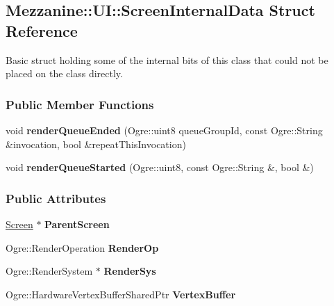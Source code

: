 \hypertarget{structMezzanine_1_1UI_1_1ScreenInternalData}{
\subsection{Mezzanine::UI::ScreenInternalData Struct Reference}
\label{structMezzanine_1_1UI_1_1ScreenInternalData}
}


Basic struct holding some of the internal bits of this class that could not be placed on the class directly.  


\subsubsection*{Public Member Functions}
\begin{DoxyCompactItemize}
\item 
\hypertarget{structMezzanine_1_1UI_1_1ScreenInternalData_a80ad5df4ba126e729748399f4bfc1aae}{
void {\bfseries renderQueueEnded} (Ogre::uint8 queueGroupId, const Ogre::String \&invocation, bool \&repeatThisInvocation)}
\label{structMezzanine_1_1UI_1_1ScreenInternalData_a80ad5df4ba126e729748399f4bfc1aae}

\item 
\hypertarget{structMezzanine_1_1UI_1_1ScreenInternalData_a2c4518c9d4adf293fce906c33f6c57f2}{
void {\bfseries renderQueueStarted} (Ogre::uint8, const Ogre::String \&, bool \&)}
\label{structMezzanine_1_1UI_1_1ScreenInternalData_a2c4518c9d4adf293fce906c33f6c57f2}

\end{DoxyCompactItemize}
\subsubsection*{Public Attributes}
\begin{DoxyCompactItemize}
\item 
\hypertarget{structMezzanine_1_1UI_1_1ScreenInternalData_a53939cdb2ea746b28f20d9b6c0e4ad5c}{
\hyperlink{classMezzanine_1_1UI_1_1Screen}{Screen} $\ast$ {\bfseries ParentScreen}}
\label{structMezzanine_1_1UI_1_1ScreenInternalData_a53939cdb2ea746b28f20d9b6c0e4ad5c}

\item 
\hypertarget{structMezzanine_1_1UI_1_1ScreenInternalData_a636b1b02657257770c7983e395c25870}{
Ogre::RenderOperation {\bfseries RenderOp}}
\label{structMezzanine_1_1UI_1_1ScreenInternalData_a636b1b02657257770c7983e395c25870}

\item 
\hypertarget{structMezzanine_1_1UI_1_1ScreenInternalData_ab9992aa35f83d6abaf70c4bb054b7005}{
Ogre::RenderSystem $\ast$ {\bfseries RenderSys}}
\label{structMezzanine_1_1UI_1_1ScreenInternalData_ab9992aa35f83d6abaf70c4bb054b7005}

\item 
\hypertarget{structMezzanine_1_1UI_1_1ScreenInternalData_a8ede2912bf5cd61f72a9abe7011e9d7d}{
Ogre::HardwareVertexBufferSharedPtr {\bfseries VertexBuffer}}
\label{structMezzanine_1_1UI_1_1ScreenInternalData_a8ede2912bf5cd61f72a9abe7011e9d7d}

\end{DoxyCompactItemize}


